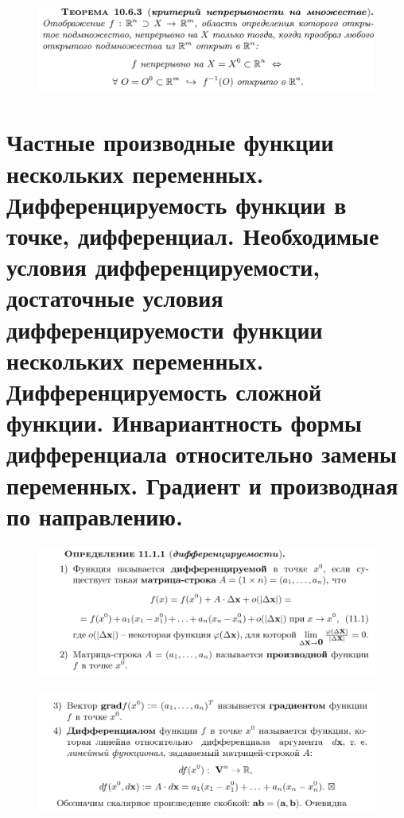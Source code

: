 \documentclass{article}
\begin{document}
\newpage
\begin{figure}[h!]
    \centering
    \includegraphics[width=\textwidth]{32.png}
    \vspace{-1cm}
\end{figure}

\newpage
\section{\color{RedViolet}\textbf{Частные производные функции нескольких переменных. Дифференцируемость функции в точке, дифференциал. Необходимые условия дифференцируемости, достаточные условия дифференцируемости функции нескольких переменных. Дифференцируемость сложной функции. Инвариантность формы дифференциала относительно замены переменных. Градиент и производная по направлению.}}
\vspace{-0.5cm}
\begin{figure}[h!]
    \centering
    \includegraphics[width=\textwidth]{33.png}
    \vspace{-1.5cm}
\end{figure}

\begin{figure}[h!]
    \centering
    \includegraphics[width=\textwidth]{34.png}
    \vspace{-1cm}
\end{figure}
\end{document}
